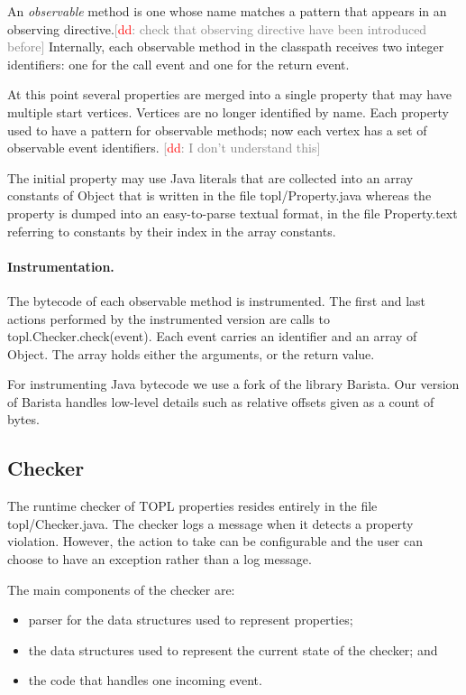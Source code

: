 \documentclass{sigplanconf}[10pt] %
\newcommand{\noterg}[2]{\textcolor{gray}{[\textcolor{red}{#1}: #2]}}
\newcommand{\dd}[1]{\noterg{dd}{#1}}
\newcommand{\dinocomment}[1]{\dd{#1}}
\begin{document}
An \emph{observable} method is one whose name matches a pattern that appears in an \textsf{observing} directive.\dinocomment{check that observing directive have been introduced before}
Internally, each observable method in the classpath receives two integer identifiers: one for the call event and one for the return event.

At this point several properties are merged into a single property that may have multiple start vertices.
Vertices are no longer identified by name.
Each property used to have a pattern for observable methods;
now each vertex has a set of observable event identifiers.
\dinocomment{I don't understand this}

The initial property may use Java literals that are collected into an array \textsf{constants} of \textsf{Object} that is written in the file \textsf{topl/Property.java}  whereas the property is dumped into an easy-to-parse textual format, in the file \textsf{Property.text}
referring to constants by their index in the array \textsf{constants}.

\paragraph{Instrumentation.}
The bytecode of each observable method is instrumented.
The first and last actions performed by the instrumented version are calls to {\sf topl.Checker.check(event)}.
Each \textsf{event} carries an identifier and an array of \textsf{Object}.
The array holds either the arguments, or the return value.

For instrumenting Java bytecode we use a fork of the library Barista.
Our version of Barista handles low-level details such as relative offsets given as a count of bytes.

\subsection{Checker} %

The runtime checker of TOPL properties resides entirely in the file {\sf topl/Checker.java}.
The checker logs a message when it detects a property violation. However, the action to take can be configurable and the user can choose to have an exception rather than a log message.

The main components of the checker are:
\begin{itemize}
\item parser for the data structures used to represent properties;
\item the data structures used to represent the current state of the checker; and
\item the code that handles one incoming event.
\end{itemize}
\end{document}
